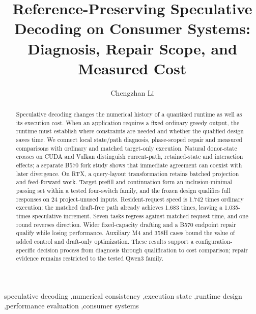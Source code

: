 \documentclass[final,5p,times,twocolumn]{elsarticle}
\begin{document}
\begin{frontmatter}
\title{Reference-Preserving Speculative Decoding on Consumer Systems: Diagnosis, Repair Scope, and Measured Cost}
\author{Chengzhan Li}
\address{University of Electronic Science and Technology of China\\[2pt]
{\normalfont\ttfamily\href{mailto:chengzhan.li@std.uestc.edu.cn}{chengzhan.li@std.uestc.edu.cn}}}
\begin{abstract}
Speculative decoding changes the numerical history of a quantized runtime as well as its execution cost. When an application requires a fixed ordinary greedy output, the runtime must establish where constraints are needed and whether the qualified design saves time. We connect local state/path diagnosis, phase-scoped repair and measured comparisons with ordinary and matched target-only execution. Natural donor-state crosses on CUDA and Vulkan distinguish current-path, retained-state and interaction effects; a separate B570 fork study shows that immediate agreement can coexist with later divergence. On RTX, a query-layout transformation retains batched projection and feed-forward work. Target prefill and continuation form an inclusion-minimal passing set within a tested four-switch family, and the frozen design qualifies full responses on 24 project-unused inputs. Resident-request speed is 1.742 times ordinary execution; the matched draft-free path already achieves 1.683 times, leaving a 1.035-times speculative increment. Seven tasks regress against matched request time, and one round reverses direction. Wider fixed-capacity drafting and a B570 endpoint repair qualify while losing performance. Auxiliary M4 and 358H cases bound the value of added control and draft-only optimization. These results support a configuration-specific decision process from diagnosis through qualification to cost comparison; repair evidence remains restricted to the tested Qwen3 family.
\end{abstract}
\begin{keyword}
speculative decoding \sep numerical consistency \sep execution state \sep runtime design \sep performance evaluation \sep consumer systems
\end{keyword}
\end{frontmatter}











\end{document}

